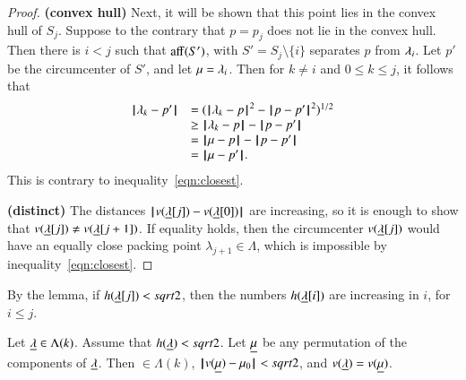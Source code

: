 \begin{proof}
{\bf (convex hull)}  Next, it will be shown that this point lies in the convex hull of $S_j$.
Suppose to the contrary that $p=p_j$ does not lie in the convex hull. Then there is $i<j$ such that ${\operatorname{aff}}(S')$, with $S'=S_j\setminus\{i\}$ separates $p$ from $\lambda_i$.  Let $p'$ be the circumcenter of $S'$, and let $\mu=\lambda_i$.  Then for $k\ne i$ and $0\le k\le j$, it follows that
$$
\begin{array}{lll}
\norm{\lam_k}{p'} &= (\norm{\lam_k}{p}^2 - \norm{p}{p'}^2)^{1/2} \\
  &\ge \norm{\lam_k}{p} - \norm{p}{p'} \\
  &=\norm{\mu}{p} - \norm{p}{p'}\\
  &=\norm{\mu}{p'}.
\end{array}
$$
This is contrary to inequality~\ref{eqn:closest}.


{\bf (distinct)}  The distances ${\hskip0.1em|\hskip-0.15em|\hskip0.1em}v({\underline{\lambda}}[j]) - v({\underline{\lambda}}[0]){\hskip0.1em|\hskip-0.15em|\hskip0.1em}$ are increasing, so it is enough to show
that $v({\underline{\lambda}}[j])\ne v({\underline{\lambda}}[j+1])$.  If  equality holds, then the circumcenter $v({\underline{\lambda}}[j])$
would have an equally close packing point $\lambda_{j+1}\in\Lambda$, which is impossible by inequality~\ref{eqn:closest}.
\end{proof}





By the lemma, if $h({\underline{\lambda}}[j])<sqrt2$, then the numbers $h({\underline{\lambda}}[i])$ are increasing in $i$, for $i\le j$.


\begin{lemma}   
Let ${\underline{\lambda}}\in\Lambda(k)$.  Assume that $h({\underline{\lambda}})<sqrt2$. Let ${\underline{\mu}}$ be any permutation of the components of ${\underline{\lambda}}$.  
Then $\bm\in\Lambda(k)$, ${\hskip0.1em|\hskip-0.15em|\hskip0.1em}v({\underline{\mu}}) - \mu_0{\hskip0.1em|\hskip-0.15em|\hskip0.1em}<sqrt2$, and  $v({\underline{\lambda}}) = v({\underline{\mu}})$.
\end{lemma}

